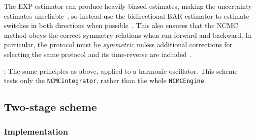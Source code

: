 \documentclass[aps,pre,twocolumn,nofootinbib,superscriptaddress,linenumbers,11point]{revtex4-1}
\begin{document}
The EXP estimator can produce heavily biased estimates, making the uncertainty estimates unreliable~\cite{shirts:jcp:2005:comparison-of-estimators}, so instead use the bidirectional BAR estimator to estimate switches in both directions when possible~\cite{bennett:jcp:1976:fe-estimate}.
This also ensures that the NCMC method obeys the correct symmetry relations when run forward and backward.
In particular, the protocol must be \emph{symmetric} unless additional corrections for selecting the same protocol and its time-reverse are included~\cite{ncmc}.

: The same principles as above, applied to a harmonic oscillator.
This scheme tests only the {\tt NCMCIntegrator}, rather than the whole {\tt NCMCEngine}.

\subsection*{Two-stage scheme}

\subsubsection*{Implementation}
\end{document}
